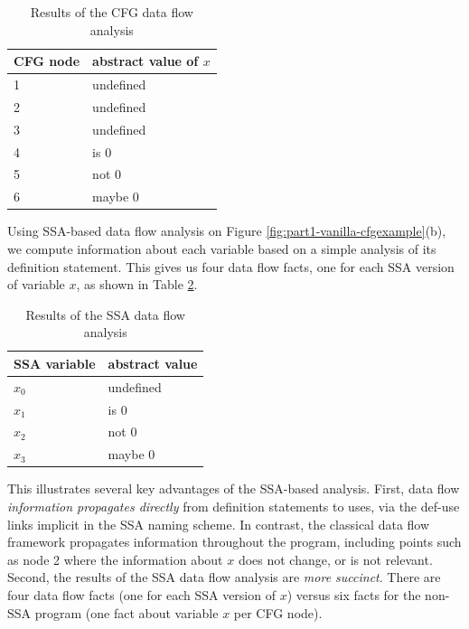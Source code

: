 \begin{table}
\begin{center}
\begin{tabular}{l|l} \hline
CFG node & abstract value of $x$ \\ \hline
1 & undefined \\
2 & undefined \\
3 & undefined \\
4 & is 0 \\
5 & not 0 \\
6 & maybe 0 \\ \hline
\end{tabular}
\end{center}
\caption{\label{tab:part1-vanilla-cfgres}Results of the CFG data flow analysis}
\end{table}

Using SSA-based data flow analysis on Figure 
\ref{fig:part1-vanilla-cfgexample}(b),
we compute information about each variable based on a simple
analysis of its definition statement. This gives us four data flow facts,
one for each SSA version of variable $x$, as shown in Table
\ref{tab:part1-vanilla-ssares}.

\begin{table}
\begin{center}
\begin{tabular}{l|l} \hline
SSA variable & abstract value \\ \hline
$x_0$ & undefined \\
$x_1$ & is 0 \\
$x_2$ & not 0 \\
$x_3$ & maybe 0 \\ \hline
\end{tabular}
\end{center}
\caption{\label{tab:part1-vanilla-ssares}Results of the SSA data flow
  analysis}
\end{table}


This illustrates several key advantages of the SSA-based analysis.
First, data flow
\textit{information propagates directly}
from definition statements to uses, via
the def-use links implicit in the SSA naming scheme. 
In contrast, the 
classical data flow framework 
propagates information throughout the program,
including points such as node 2 where the information 
about $x$ does not change, or is not relevant.
Second, the results of the SSA data flow analysis are
\textit{more succinct}.
There are four data flow facts (one for each SSA version of $x$)
versus six facts for the non-SSA program (one fact about variable $x$
per CFG node).


